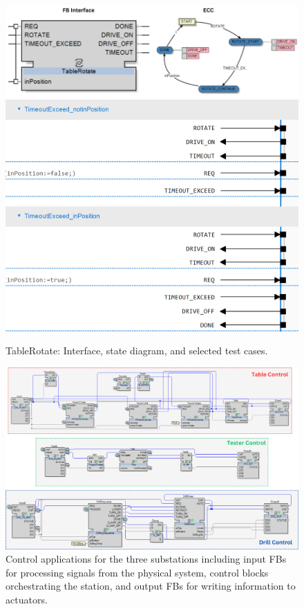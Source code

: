 \begin{bibunit}
\begin{figure}[!htbp]
	\centering
		\includegraphics[width=0.99\linewidth,clip]{MX_Papers/Paper10/Figures/TableRotate.png}
            \includegraphics[width=0.99\linewidth]{MX_Papers/Paper10/Figures/tests_casestudy/Service-TableRotate_selected.png}
        \caption{TableRotate: Interface, state diagram, and selected test cases.}
		\label{fig:TableRotate}	
 \end{figure}

\begin{figure}[!htbp]
	\centering
		\includegraphics[width=0.99\linewidth,clip]{MX_Papers/Paper10/Figures/FB_App.png}
		\caption{Control applications for the three substations including input FBs for processing signals from the physical system, control blocks orchestrating the station, and output FBs for writing information to actuators.}
		\label{fig:Application}	
 \end{figure}


\end{bibunit}
